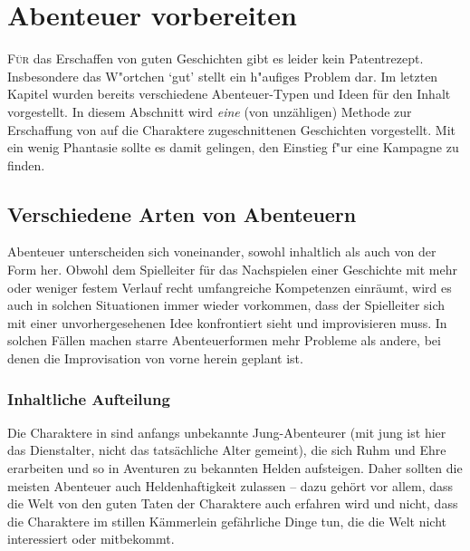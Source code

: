 \chapter{Abenteuer vorbereiten}\label{Ch:AbenteuerVorbereiten}
\lettrine[lraise=0.1]{F}{ür} das Erschaffen von guten Geschichten gibt es leider kein Patentrezept. Insbesondere das W"ortchen `gut' stellt ein h"aufiges Problem dar. Im letzten Kapitel wurden bereits verschiedene Abenteuer-Typen und Ideen für den Inhalt vorgestellt. In diesem Abschnitt wird \emph{eine} (von unzähligen) Methode zur Erschaffung von auf die Charaktere zugeschnittenen Geschichten vorgestellt. Mit ein wenig Phantasie sollte es damit gelingen, den Einstieg f"ur eine Kampagne \StoryDSA zu finden.







\section{Verschiedene Arten von Abenteuern}
Abenteuer unterscheiden sich voneinander, sowohl inhaltlich als auch von der Form her. Obwohl \StoryDSA dem Spielleiter für das Nachspielen einer Geschichte mit mehr oder weniger festem Verlauf recht umfangreiche Kompetenzen einräumt, wird es auch in solchen Situationen immer wieder vorkommen, dass der Spielleiter sich mit einer unvorhergesehenen Idee konfrontiert sieht und improvisieren muss. In solchen Fällen machen starre Abenteuerformen mehr Probleme als andere, bei denen die Improvisation von vorne herein geplant ist.

\subsection{Inhaltliche Aufteilung}
Die Charaktere in \StoryDSA sind anfangs unbekannte Jung-Abenteurer (mit jung ist hier das Dienstalter, nicht das tatsächliche Alter gemeint), die sich Ruhm und Ehre erarbeiten und so in Aventuren zu bekannten Helden aufsteigen. Daher sollten die meisten Abenteuer auch Heldenhaftigkeit zulassen -- dazu gehört vor allem, dass die Welt von den guten Taten der Charaktere auch erfahren wird und nicht, dass die Charaktere im stillen Kämmerlein gefährliche Dinge tun, die die Welt nicht interessiert oder mitbekommt.


